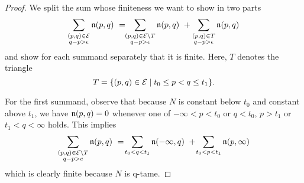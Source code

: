 \begin{proof}
	We split the sum whose finiteness we want to show in two parts
	\begin{equation*}
	\sum_{ \substack{ (p,q) \in \mathcal{E} \\ q-p > \epsilon } } \mathfrak{n} (p,q)
	\ = \!\!
	\sum_{ \substack{ (p,q) \in \mathcal{E} \setminus T \\ q-p > \epsilon } } \mathfrak{n} (p,q)
	\ +
	\sum_{ \substack{ (p,q) \in T \\ q-p > \epsilon } } \mathfrak{n} (p,q)
	\end{equation*}
	and show for each summand separately that it is finite.
	Here, $T$ denotes the triangle
	\begin{equation*}
	T = \{(p,q) \in \mathcal{E} \mid t_0 \leq p < q \leq t_1\}.
	\end{equation*}
	
	For the first summand, observe that because $N$ is constant below $t_0$ and constant above $t_1$, we have $\mathfrak{n}(p,q) = 0$ whenever one of $-\infty < p < t_0$ or $q < t_0$, $p > t_1$ or $t_1 < q < \infty$ holds.
	This implies 
	\begin{equation*}
	\sum_{ \substack{ (p,q) \in \mathcal{E} \setminus T \\ q-p > e } } \mathfrak{n} (p,q)
	\ = \!
	\sum_{t_0 < q < t_1} \mathfrak{n} (-\infty,q)
	\ + \!
	\sum_{t_0 < p < t_1} \mathfrak{n} (p, \infty)
	\end{equation*}
	which is clearly finite because $N$ is q-tame.
	

\end{proof}
